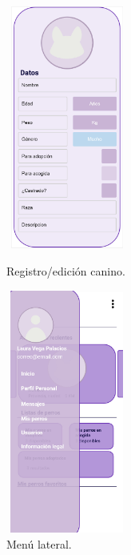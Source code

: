 \documentclass[a4paper, 12pt]{article}
\begin{document}
\begin{figure}[H]
   	\begin{minipage}{0.48\textwidth}
		\begin{center}
			{\includegraphics[height=8cm, width=4cm]{RegisterDog.jpg}\par}
			\caption{Registro/edición canino.}
			\medskip
		\end{center}  
	\end{minipage}\hfill
   	\begin{minipage}{0.48\textwidth}
		\begin{center}
			{\includegraphics[height=8cm, width=4cm]{SideMenu.jpg}\par}
			\caption{Menú lateral.}
			\medskip
		\end{center}  
	\end{minipage}\hfill
\end{figure}
\end{document}
